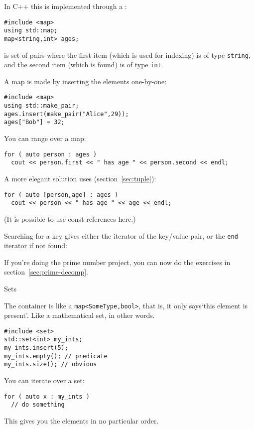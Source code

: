 In C++ this is implemented through a :
\begin{lstlisting}
#include <map>
using std::map;
map<string,int> ages;
\end{lstlisting}
is set of
pairs where the first item (which is used for indexing) is of type
\lstinline{string}, and the second item (which is found) is of type \lstinline{int}.

A map is made by inserting the elements one-by-one:
\begin{lstlisting}
#include <map>
using std::make_pair;
ages.insert(make_pair("Alice",29));
ages["Bob"] = 32;
\end{lstlisting}

You can range over a map:
\begin{lstlisting}
for ( auto person : ages )
  cout << person.first << " has age " << person.second << endl;
\end{lstlisting}
A more elegant solution uses
 (section~\ref{sec:tuple}):
\begin{lstlisting}
for ( auto [person,age] : ages )
  cout << person << " has age " << age << endl;
\end{lstlisting}
(It is possible to use const-references here.)

Searching for a key gives either the iterator of the key/value pair,
or the \lstinline{end} iterator if not found:
%

\begin{exercise}
  If you're doing the prime number project, you can now do
  the exercises in section~\ref{sec:prime-decomp}.
\end{exercise}

 {Sets}
\label{sec:stdset}

The  container is like a \lstinline+map<SomeType,bool>+,
that is, it only says`this element is present'.
Like a mathematical set, in other words.

\begin{lstlisting}
#include <set>
std::set<int> my_ints;
my_ints.insert(5);
my_ints.empty(); // predicate
my_ints.size(); // obvious
\end{lstlisting}

You can iterate over a set:
\begin{lstlisting}
for ( auto x : my_ints )
  // do something  
\end{lstlisting}
This gives you the elements in no particular order.

